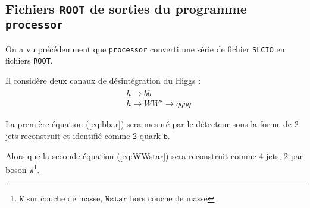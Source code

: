 \documentclass[10pt,a4paper]{report}
\newcommand{\ROOT}{\texttt{ROOT}\xspace}
\newcommand{\SLCIO}{\texttt{SLCIO}\xspace}
\newcommand{\processor}{\texttt{processor}\xspace}
\newcommand{\particle}[1]{$\texttt{#1}$}
\newcommand{\bbar}{\overline{b}}
\newcommand{\Wstar}{W^{\star}}
\begin{document}
\begin{appendix}
\chapter{Fichiers \ROOT de sorties du programme \processor}

On a vu précédemment que \processor converti une série de fichier \SLCIO en fichiers \ROOT. 

Il considère deux canaux de désintégration du Higgs :
\begin{align}
	& h \longrightarrow b \bbar \label{eq:bbar}\\
	& h \longrightarrow W \Wstar \longrightarrow qqqq \label{eq:WWstar}
\end{align}

La première équation (\ref{eq:bbar}) sera mesuré par le détecteur sous la forme de 2 jets reconstruit et identifié comme 2 quark \particle{b}.

Alors que la seconde équation (\ref{eq:WWstar}) sera reconstruit comme 4 jets, 2 par boson \particle{W}\footnote{\particle{W} sur couche de masse, \particle{Wstar} hors couche de masse}.

\end{appendix}


\listoffigures


%





\end{document}
